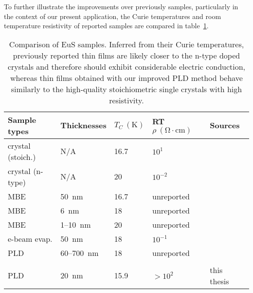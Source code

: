To further illustrate the improvements over previously samples, particularly in the context of our present application, the Curie temperatures and room temperature resistivity of reported samples are compared in table~\ref{tab:EuS_comparison}. %
%
\begin{table}[ht]%
    \centering%
    \begin{tabularx}{0.95\columnwidth}[t]{l|l|l|l|X}
        \hline\hline
        Sample types & Thicknesses & $T_C~\mathrm{(K)}$ & RT $\rho~\mathrm{(\Omega\cdot{}cm)}$ & Sources\\
        \hline
        crystal (stoich.) & N/A & 16.7 & $10^1$ & \citeauthor{EuS_Shafer}~\citeyear{EuS_Shafer}~\cite{EuS_Shafer}\\
        \hline
        crystal (n-type) & N/A & 20 & $10^{-2}$ & \citeauthor{EuS_ntype}~\citeyear{EuS_ntype}~\cite{EuS_ntype}\\
        \hline
        MBE & 50~nm & 16.7 & unreported & \citeauthor{EuS_MBE_Dauth}~\citeyear{EuS_MBE_Dauth}~\cite{EuS_MBE_Dauth}\\
        \hline
        MBE & 6~nm & 18 & unreported & \citeauthor{EuS_MBE_Muller}~\citeyear{EuS_MBE_Muller}~\cite{EuS_MBE_Muller}\\
        \hline
        MBE & 1--10~nm & 20 & unreported & \citeauthor{Moodera2013}~\citeyear{Moodera2013}~\cite{Moodera2013}\\
        \hline
        e-beam evap. & 50~nm & 18 & $10^{-1}$ & \citeauthor{EuS_thin_film_Keller}~\citeyear{EuS_thin_film_Keller}~\cite{EuS_thin_film_Keller}\\
        \hline
        PLD & 60--700~nm & 18 & unreported & \citeauthor{EuS_PLD1}~\citeyear{EuS_PLD1}~\cite{EuS_PLD1}\\
        \hline
        \\
        \hline
        PLD & 20~nm & 15.9 & $>10^{2}$ & this thesis~\cite{EuS_PLD}\\
        \hline\hline
    \end{tabularx}
    \caption[Comparison of EuS samples]{\label{tab:EuS_comparison}Comparison of EuS samples. Inferred from their Curie temperatures, previously reported thin films are likely closer to the n-type doped crystals and therefore should exhibit considerable electric conduction, whereas thin films obtained with our improved PLD method behave similarly to the high-quality stoichiometric single crystals with high resistivity.}
\end{table}%
%
